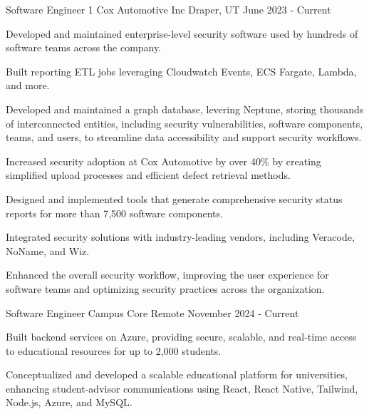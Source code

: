 


\begin{cventries}


\cventry
{Software Engineer 1} %
{Cox Automotive Inc} %
{Draper, UT} %
{June 2023 - Current} %
{ %
\begin{cvitems}
\item {Developed and maintained enterprise-level security software used by hundreds of software teams across the company.}
\item {Built reporting ETL jobs leveraging Cloudwatch Events, ECS Fargate, Lambda, and more.}
\item {Developed and maintained a graph database, levering Neptune, storing thousands of interconnected entities, including security vulnerabilities, software components, teams, and users, to streamline data accessibility and support security workflows.}
\item {Increased security adoption at Cox Automotive by over 40\% by creating simplified upload processes and efficient defect retrieval methods.}
\item {Designed and implemented tools that generate comprehensive security status reports for more than 7,500 software components.}
\item {Integrated security solutions with industry-leading vendors, including Veracode, NoName, and Wiz.}
\item {Enhanced the overall security workflow, improving the user experience for software teams and optimizing security practices across the organization.}
\end{cvitems}
}


\cventry
{Software Engineer} %
{Campus Core} %
{Remote} %
{November 2024 - Current} %
{ %
\begin{cvitems}
\item {Built backend services on Azure, providing secure, scalable, and real-time access to educational resources for up to 2,000 students.}
\item {Conceptualized and developed a scalable educational platform for universities, enhancing student-advisor communications using React, React Native, Tailwind, Node.js, Azure, and MySQL.}
\end{cvitems}
}


\end{cventries}
